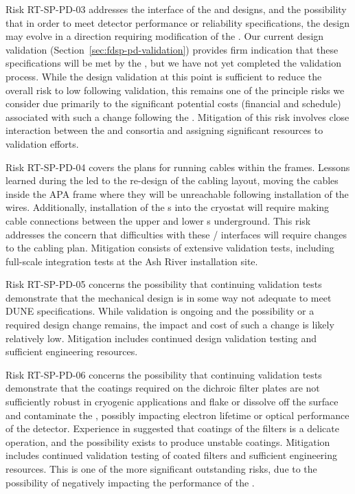 Risk RT-SP-PD-03 addresses the interface of the  and  designs, and the possibility that in order to meet detector performance or reliability specifications, the  design may evolve in a direction requiring modification of the .  Our current design validation (Section~\ref{sec:fdsp-pd-validation}) provides firm indication that these specifications will be met by the , but we have not yet completed the validation process.  While the design validation at this point is sufficient to reduce the overall risk to low following validation, this remains one of the principle risks we consider due primarily to the significant potential costs (financial and schedule) associated with such a change following the .  Mitigation of this risk involves close interaction between the  and  consortia and assigning significant resources to  validation efforts.

Risk RT-SP-PD-04 covers the plans for running  cables within the  frames.  Lessons learned during the  led to the re-design of the  cabling layout, moving the cables inside the APA frame where they will be unreachable following installation of the  wires.  Additionally, installation of the s into the cryostat will require making  cable connections between the upper and lower s underground.  This risk addresses the concern that difficulties with these / interfaces will require changes to the cabling plan.  Mitigation consists of extensive validation tests, including full-scale integration tests at the Ash River installation site.

Risk RT-SP-PD-05 concerns the possibility that continuing validation tests demonstrate that the  mechanical design is in some way not adequate to meet DUNE specifications.  While validation is ongoing and the possibility or a required design change remains, the impact and cost of such a change is likely relatively low.  Mitigation includes continued design validation testing and sufficient engineering resources.

Risk RT-SP-PD-06 concerns the possibility that continuing validation tests demonstrate that the coatings required on the dichroic filter plates are not sufficiently robust in cryogenic applications and flake or dissolve off the surface and contaminate the , possibly impacting electron lifetime or optical performance of the detector.  Experience in  suggested that coatings of the filters is a delicate operation, and the possibility exists to produce unstable coatings.  Mitigation includes continued validation testing of coated filters and sufficient engineering resources.  This is one of the more significant outstanding risks, due to the possibility of negatively impacting the performance of the .


